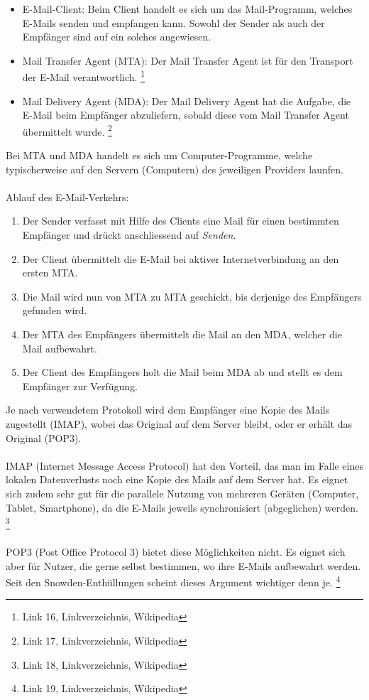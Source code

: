 \begin{itemize}
\item E-Mail-Client: Beim Client handelt es sich um das Mail-Programm, welches E-Mails senden und empfangen kann. Sowohl der Sender als auch der Empfänger sind auf ein solches angewiesen.
\item Mail Transfer Agent (MTA): Der Mail Transfer Agent ist für den Transport der E-Mail verantwortlich.
\footnote{Link 16, Linkverzeichnis, Wikipedia}
\item Mail Delivery Agent (MDA): Der Mail Delivery Agent hat die Aufgabe, die E-Mail beim Empfänger abzuliefern, sobald diese vom Mail Transfer Agent übermittelt wurde.
\footnote{Link 17, Linkverzeichnis, Wikipedia}
\end{itemize}

Bei MTA und MDA handelt es sich um Computer-Programme, welche typischerweise auf den Servern (Computern) des jeweiligen Providers launfen.
\\
\\
Ablauf des E-Mail-Verkehrs:

\begin{enumerate}
\item Der Sender verfasst mit Hilfe des Clients eine Mail für einen bestimmten Empfänger und drückt anschliessend auf \textit{Senden}.
\item Der Client übermittelt die E-Mail bei aktiver Internetverbindung an den ersten MTA.
\item Die Mail wird nun von MTA zu MTA geschickt, bis derjenige des Empfängers gefunden wird.
\item Der MTA des Empfängers übermittelt die Mail an den MDA, welcher die Mail aufbewahrt.
\item Der Client des Empfängers holt die Mail beim MDA ab und stellt es dem Empfänger zur Verfügung.
\end{enumerate}

Je nach verwendetem Protokoll wird dem Empfänger eine Kopie des Mails zugestellt (IMAP), wobei das Original auf dem Server bleibt, oder er erhält das Original (POP3).
\\
\\
IMAP (Internet Message Access Protocol) hat den Vorteil, das man im Falle eines lokalen Datenverlusts noch eine Kopie des Mails auf dem Server hat. Es eignet sich zudem sehr gut für die parallele Nutzung von mehreren Geräten (Computer, Tablet, Smartphone), da die E-Mails jeweils synchronisiert (abgeglichen) werden.
\footnote{Link 18, Linkverzeichnis, Wikipedia}
\\
\\
POP3 (Post Office Protocol 3) bietet diese Möglichkeiten nicht. Es eignet sich aber für Nutzer, die gerne selbst bestimmen, wo ihre E-Mails aufbewahrt werden. Seit den Snowden-Enthüllungen scheint dieses Argument wichtiger denn je.
\footnote{Link 19, Linkverzeichnis, Wikipedia}

